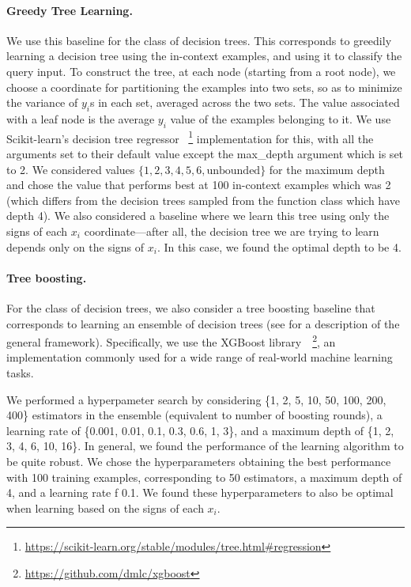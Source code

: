 \documentclass{article}
\begin{document}
\paragraph{Greedy Tree Learning.} We use this baseline for the class of decision trees. This corresponds to greedily learning a decision tree using the in-context examples, and using it to classify the query input. To construct the tree, at each node (starting from a root node), we choose a coordinate for partitioning the examples into two sets, so as to minimize the variance of $y_i$s in each set, averaged across the two sets. The value associated with a leaf node is the average $y_i$ value of the examples belonging to it. We use Scikit-learn's decision tree regressor \citep{scikit-learn}
~\footnote{\scriptsize\url{https://scikit-learn.org/stable/modules/tree.html\#regression}} implementation for this, with all the arguments set to their default value except the max\_depth argument which is set to 2. 
We considered values $\{1, 2, 3, 4, 5, 6, \text{unbounded}\}$ for the maximum depth and chose the value that performs best at 100 in-context examples which was 2 (which differs from the decision trees sampled from the function class which have depth 4).
We also considered a baseline where we learn this tree using only the signs of each $x_i$ coordinate---after all, the decision tree we are trying to learn depends only on the signs of $x_i$.
In this case, we found the optimal depth to be 4.

\paragraph{Tree boosting.} For the class of decision trees, we also consider a tree boosting baseline that corresponds to learning an ensemble of decision trees (see \citet{friedman2001greedy} for a description of the general framework).
Specifically, we use the XGBoost library~\citep{chen2016xgboost}~\footnote{\scriptsize\url{https://github.com/dmlc/xgboost}}, an implementation commonly used for a wide range of real-world machine learning tasks.

We performed a hyperpameter search by considering \{1, 2, 5, 10, 50, 100, 200, 400\} estimators in the ensemble (equivalent to number of boosting rounds), a learning rate of \{0.001, 0.01, 0.1, 0.3, 0.6, 1, 3\}, and a maximum depth of \{1, 2, 3, 4, 6, 10, 16\}.
In general, we found the performance of the learning algorithm to be quite robust.
We chose the hyperparameters obtaining the best performance with 100 training examples, corresponding to 50 estimators, a maximum depth of 4, and a learning rate f 0.1.
We found these hyperparameters to also be optimal when learning based on the signs of each $x_i$.
\end{document}

